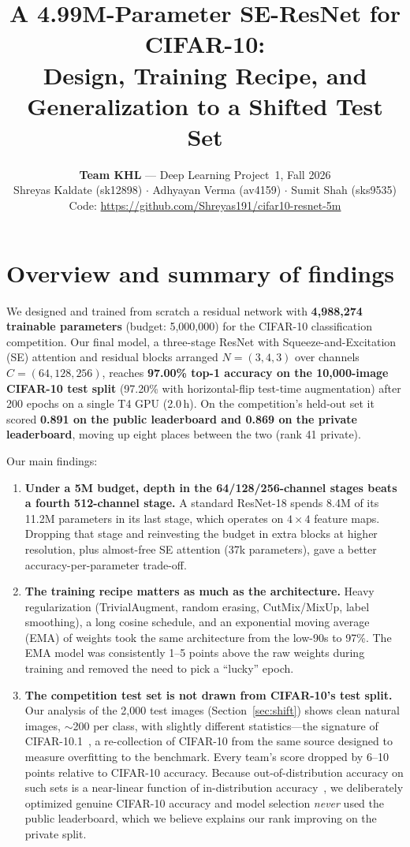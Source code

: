 \documentclass[11pt]{article}
\title{\vspace{-1.2em}\textbf{A 4.99M-Parameter SE-ResNet for CIFAR-10:\\ Design, Training Recipe, and Generalization to a Shifted Test Set}\vspace{-0.4em}}
\author{%
\textbf{Team KHL} --- Deep Learning Project~1, Fall 2026\\[2pt]
Shreyas Kaldate (sk12898) \quad $\cdot$ \quad Adhyayan Verma (av4159) \quad $\cdot$ \quad Sumit Shah (sks9535)\\[4pt]
Code: \url{https://github.com/Shreyas191/cifar10-resnet-5m}%
}
\date{\vspace{-1.6em}}
\begin{document}
\maketitle
\vspace{-1.5em}

\section{Overview and summary of findings}
We designed and trained from scratch a residual network with \textbf{4{,}988{,}274 trainable parameters} (budget: 5{,}000{,}000) for the CIFAR-10 classification competition. Our final model, a three-stage ResNet with Squeeze-and-Excitation (SE) attention and residual blocks arranged $N=(3,4,3)$ over channels $C=(64,128,256)$, reaches \textbf{97.00\% top-1 accuracy on the 10{,}000-image CIFAR-10 test split} (97.20\% with horizontal-flip test-time augmentation) after 200 epochs on a single T4 GPU (2.0\,h). On the competition's held-out set it scored \textbf{0.891 on the public leaderboard and 0.869 on the private leaderboard}, moving up eight places between the two (rank 41 private).

Our main findings:
\begin{enumerate}
\item \textbf{Under a 5M budget, depth in the 64/128/256-channel stages beats a fourth 512-channel stage.} A standard ResNet-18 spends 8.4M of its 11.2M parameters in its last stage, which operates on $4\times4$ feature maps. Dropping that stage and reinvesting the budget in extra blocks at higher resolution, plus almost-free SE attention (37k parameters), gave a better accuracy-per-parameter trade-off.
\item \textbf{The training recipe matters as much as the architecture.} Heavy regularization (TrivialAugment, random erasing, CutMix/MixUp, label smoothing), a long cosine schedule, and an exponential moving average (EMA) of weights took the same architecture from the low-90s to 97\%. The EMA model was consistently 1--5 points above the raw weights during training and removed the need to pick a ``lucky'' epoch.
\item \textbf{The competition test set is not drawn from CIFAR-10's test split.} Our analysis of the 2{,}000 test images (Section~\ref{sec:shift}) shows clean natural images, $\sim$200 per class, with slightly different statistics---the signature of CIFAR-10.1~\cite{recht2019}, a re-collection of CIFAR-10 from the same source designed to measure overfitting to the benchmark. Every team's score dropped by 6--10 points relative to CIFAR-10 accuracy. Because out-of-distribution accuracy on such sets is a near-linear function of in-distribution accuracy~\cite{miller2021}, we deliberately optimized genuine CIFAR-10 accuracy and model selection \emph{never} used the public leaderboard, which we believe explains our rank improving on the private split.
\end{enumerate}
\end{document}
